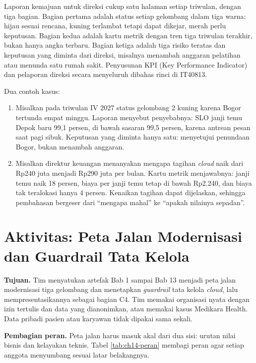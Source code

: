 Laporan kemajuan untuk direksi cukup satu halaman setiap triwulan, dengan tiga bagian. Bagian
pertama adalah status setiap gelombang dalam tiga warna: hijau sesuai rencana, kuning terlambat
tetapi dapat dikejar, merah perlu keputusan. Bagian kedua adalah kartu metrik dengan tren tiga
triwulan terakhir, bukan hanya angka terbaru. Bagian ketiga adalah tiga risiko teratas dan
keputusan yang diminta dari direksi, misalnya menambah anggaran pelatihan atau menunda satu rumah
sakit. Penyusunan KPI (Key Performance Indicator) dan pelaporan direksi secara menyeluruh dibahas
rinci di IT40813.

Dua contoh kasus:
\begin{enumerate}
  \item Misalkan pada triwulan IV 2027 status gelombang 2 kuning karena Bogor tertunda empat minggu.
        Laporan menyebut penyebabnya: SLO janji temu Depok baru 99,1 persen, di bawah sasaran 99,5
        persen, karena antrean pesan saat pagi sibuk. Keputusan yang diminta hanya satu: menyetujui
        penundaan Bogor, bukan menambah anggaran.
  \item Misalkan direktur keuangan menanyakan mengapa tagihan \textit{cloud} naik dari Rp240 juta
        menjadi Rp290 juta per bulan. Kartu metrik menjawabnya: janji temu naik 18 persen, biaya per
        janji temu tetap di bawah Rp2.240, dan biaya tak teralokasi hanya 4 persen. Kenaikan tagihan
        dapat dijelaskan, sehingga pembahasan bergeser dari ``mengapa mahal'' ke ``apakah nilainya
        sepadan''.
\end{enumerate}

\section{Aktivitas: Peta Jalan Modernisasi dan Guardrail Tata Kelola}
\label{sec:ch14-aktivitas}

\textbf{Tujuan.} Tim menyatukan artefak Bab 1 sampai Bab 13 menjadi peta jalan modernisasi tiga
gelombang dan menetapkan \textit{guardrail} tata kelola \textit{cloud}, lalu mempresentasikannya
sebagai bagian C4. Tim memakai organisasi nyata dengan izin tertulis dan data yang dianonimkan, atau
memakai kasus Medikara Health. Data pribadi pasien atau karyawan tidak dipakai sama sekali.

\textbf{Pembagian peran.} Peta jalan harus masuk akal dari dua sisi: urutan nilai bisnis dan
kelayakan teknis. Tabel \ref{tab:ch14-peran} membagi peran agar setiap anggota menyumbang sesuai
latar belakangnya.

